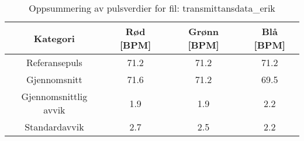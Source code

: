 
\begin{table}[H]
\centering
\caption{Oppsummering av pulsverdier for fil: transmittansdata\_erik}
\label{tab:transmittansdata\_erik\_summary}
\begin{tabular}{|c|c|c|c|}
\hline
\textbf{Kategori} & \textbf{Rød [BPM]} & \textbf{Grønn [BPM]} & \textbf{Blå [BPM]} \\ \hline
Referansepuls & 71.2 & 71.2 & 71.2 \\ \hline
Gjennomsnitt & 71.6 & 71.2 & 69.5 \\ \hline
Gjennomsnittlig avvik & 1.9 & 1.9 & 2.2 \\ \hline
Standardavvik & 2.7 & 2.5 & 2.2 \\ \hline
\end{tabular}
\end{table}
